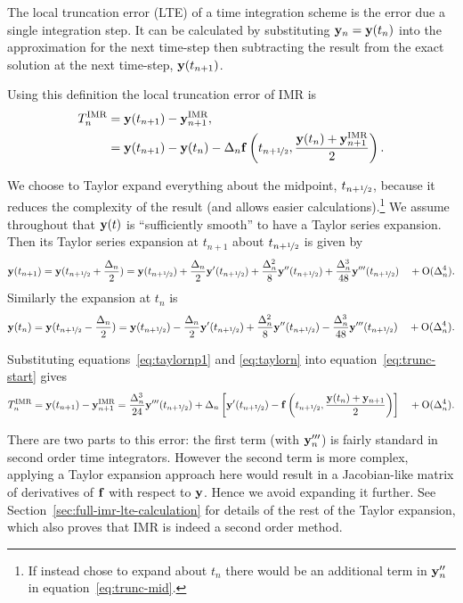 The local truncation error (LTE) of a time integration scheme is the error due a single integration step.
It can be calculated by substituting $\mathbf{y}_n = \mathbf{y}(t_n)$ into the approximation for the next time-step then subtracting the result from the exact solution at the next time-step, $\mathbf{y}(t_{n+1})$.

Using this definition the local truncation error of IMR is
\begin{align}
  \lte^\IMP &= \yv(t_{n+1}) - \yv_{n+1}^\IMP, \notag\\
  &= \yv(t_{n+1}) - \yv(t_n) - \dtn \fv\left( \thf, \frac{\yv(t_n) + \yv_{n+1}^\IMP}{2} \right).
  \label{eq:trunc-start}
\end{align}

We choose to Taylor expand everything about the midpoint, $t_{n+\nicefrac{1}{2}}$, because it reduces the complexity of the result (and allows easier calculations).\footnote{If instead chose to expand about $t_n$ there would be an additional term in $\mathbf{y}_n''$ in equation~\eqref{eq:trunc-mid}.}
We assume throughout that $\mathbf{y}(t)$ is ``sufficiently smooth'' to have a Taylor series expansion. Then its Taylor series expansion at $t_{n+1}$ about $t_{n+\nicefrac{1}{2}}$ is given by
\begin{equation}
  \yv(t_{n+1}) = \yv(\thf + \frac{\dtn}{2}) = \yvhf + \frac{\dtn}{2} \yvhf['] + \frac{\dtn^2}{8} \yvhf[''] + \frac{\dtn^3}{48} \yvhf['''] \porder{\dtn^4}.
  \label{eq:taylornp1}
\end{equation}
Similarly the expansion at $t_n$ is
\begin{equation}
  \yv(t_n) = \yv(\thf - \frac{\dtn}{2}) = \yvhf - \frac{\dtn}{2} \yvhf['] + \frac{\dtn^2}{8} \yvhf[''] - \frac{\dtn^3}{48} \yvhf['''] \porder{\dtn^4}.
  \label{eq:taylorn}
\end{equation}

Substituting equations~\eqref{eq:taylornp1} and \eqref{eq:taylorn} into equation~\eqref{eq:trunc-start} gives
\begin{equation}
  \lte^\IMP = \yv(t_{n+1}) - \yv_{n+1}^\IMP
  = \frac{\dtn^3}{24} \yvhf[''']  + \dtn  \left[ \yvhf[']
  - \fv\left( \thf, \frac{\yv(t_n) + \yv_{n+1}}{2} \right) \right]  \porder{\dtn^4}.
  \label{eq:trunc-mid}
\end{equation}

There are two parts to this error: the first term (with $\mathbf{y}'''_n$) is fairly standard in second order time integrators.
However the second term is more complex, applying a Taylor expansion approach here would result in a Jacobian-like matrix of derivatives of ${\mathbf{f}}$ with respect to $\mathbf{y}$.
Hence we avoid expanding it further.
See Section~\ref{sec:full-imr-lte-calculation} for details of the rest of the Taylor expansion, which also proves that IMR is indeed a second order method.


